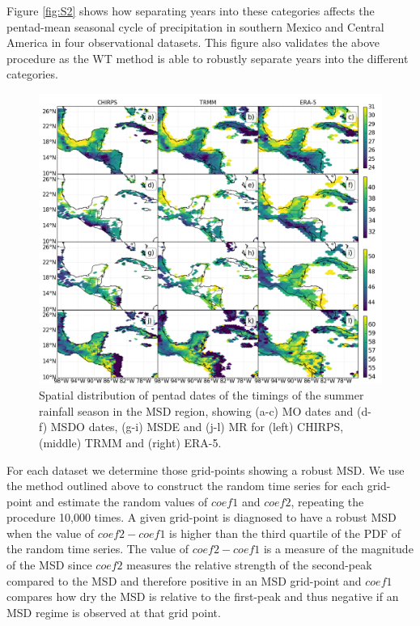  Figure \ref{fig:S2} shows how separating years into these categories affects the pentad-mean seasonal cycle of precipitation in southern Mexico and Central America in four observational datasets. This figure also validates the above procedure as the WT method is able to robustly separate years into the different categories. 

\begin{figure}[b!]
\centering
 \includegraphics[width=\linewidth]{figures/wav_fig13.png}
\caption[Spatial distribution of MSD timings]{  Spatial distribution of pentad dates of the timings of the summer rainfall season in the MSD region, showing (a-c) MO dates and (d- f) MSDO dates, (g-i) MSDE and (j-l) MR for (left) CHIRPS, (middle) TRMM and (right) ERA-5. }
\label{fig:wav_fig13}
\end{figure}

For each dataset we determine those grid-points showing a robust MSD. We use the method outlined above to construct the random time series for each grid-point and estimate the random values of $coef1$ and $coef2$, repeating the procedure 10,000 times. A given grid-point is diagnosed to have a robust MSD when the value of $coef2-coef1$ is higher than the third quartile of the PDF of the random time series. The value of $coef2-coef1$ is a measure of the magnitude of the MSD since $coef2$ measures the relative strength of the second-peak compared to the MSD and therefore positive in an MSD grid-point and $coef1$ compares how dry the MSD is relative to the first-peak and thus negative if an MSD regime is observed at that grid point. 


